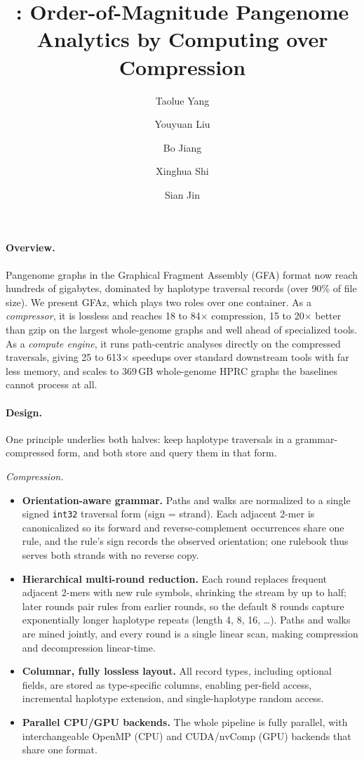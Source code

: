 \documentclass[11pt]{article}
\title{\vspace{-2.5em}\gfaz: Order-of-Magnitude Pangenome Analytics by Computing over Compression}
\author[1]{Taolue Yang}
\author[1]{Youyuan Liu}
\author[1]{Bo Jiang}
\author[1]{Xinghua Shi}
\author[1]{Sian Jin}
\affil[1]{Temple University, Philadelphia, PA, USA}
\date{}
\newcommand{\gfaz}{GFAz\xspace}
\begin{document}
\maketitle
\vspace{-3em}

\paragraph{Overview.}
Pangenome graphs in the Graphical Fragment Assembly (GFA) format now reach hundreds
of gigabytes, dominated by haplotype traversal records (over 90\% of file size). We
present \gfaz, which plays two roles over one container. As a \emph{compressor}, it is
lossless and reaches 18 to 84$\times$ compression, 15 to 20$\times$ better than gzip on
the largest whole-genome graphs and well ahead of specialized tools. As a
\emph{compute engine}, it runs path-centric analyses directly on the compressed
traversals, giving 25 to 613$\times$ speedups over standard downstream tools with far
less memory, and scales to 369\,GB whole-genome HPRC graphs the baselines cannot
process at all.

\paragraph{Design.}
One principle underlies both halves: keep haplotype traversals in a grammar-compressed
form, and both store and query them in that form.

\smallskip\noindent\emph{Compression.}
\begin{itemize}[nosep, leftmargin=1.2em]
  \item \textbf{Orientation-aware grammar.} Paths and walks are normalized to a single
        signed \texttt{int32} traversal form (sign = strand). Each adjacent 2-mer is
        canonicalized so its forward and reverse-complement occurrences share one
        rule, and the rule's sign records the observed orientation; one rulebook thus
        serves both strands with no reverse copy.
  \item \textbf{Hierarchical multi-round reduction.} Each round replaces frequent
        adjacent 2-mers with new rule symbols, shrinking the stream by up to half;
        later rounds pair rules from earlier rounds, so the default 8 rounds capture
        exponentially longer haplotype repeats (length 4, 8, 16, \dots). Paths and
        walks are mined jointly, and every round is a single linear scan, making
        compression and decompression linear-time.
  \item \textbf{Columnar, fully lossless layout.} All record types, including
        optional fields, are stored as type-specific columns, enabling per-field
        access, incremental haplotype extension, and single-haplotype random access.
  \item \textbf{Parallel CPU/GPU backends.} The whole pipeline is fully parallel, with
        interchangeable OpenMP (CPU) and CUDA/nvComp (GPU) backends that share one
        format.
\end{itemize}
\end{document}
